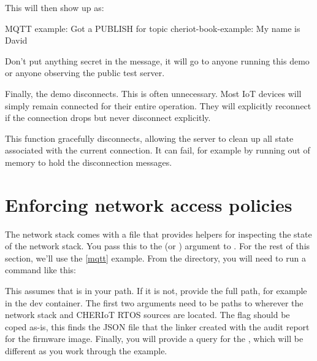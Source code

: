 This will then show up as:

\begin{console}
MQTT example: Got a PUBLISH for topic cheriot-book-example: My name is David
\end{console}

Don't put anything secret in the message, it will go to anyone running this demo or anyone observing the public test server.

Finally, the demo disconnects.
This is often unnecessary.
Most IoT devices will simply remain connected for their entire operation.
They will explicitly reconnect if the connection drops but never disconnect explicitly.

\codelisting[filename=examples/mqtt/mqtt.cc,marker=disconnect,label=lst:mqttdisconnect,caption="Gracefully disconnecting from an MQTT server."]{}

This function gracefully disconnects, allowing the server to clean up all state associated with the current connection.
It can fail, for example by running out of memory to hold the disconnection messages.


\section{Enforcing network access policies}

The network stack comes with a  file that provides helpers for inspecting the state of the network stack.
You pass this to the  (or ) argument to .
For the rest of this section, we'll use  the \ref{mqtt} example.
From the  directory, you will need to run a command like this:

\begin{console}
$ cheriot-audit -m path/to/network-stack/network_stack.rego \\
	-b path/to/sdk/boards/sonata.json \\
	-j build/cheriot/cheriot/release/mqtt.json \\
	-q {query\}
\end{console}

This assumes that  is in your path.
If it is not, provide the full path, for example  in the dev container.
The first two arguments need to be paths to wherever the network stack and CHERIoT RTOS sources are located.
The  flag should be coped as-is, this finds the JSON file that the linker created with the audit report for the firmware image.
Finally, you will provide a query for the , which will be different as you work through the example.

